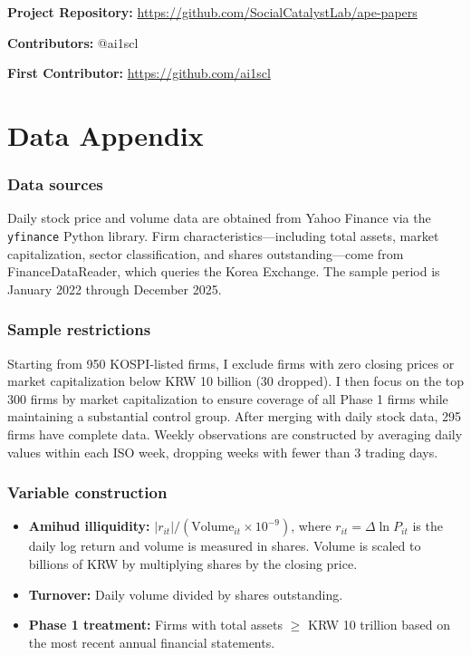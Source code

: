 \documentclass[12pt]{article}
\begin{document}
\noindent\textbf{Project Repository:} \url{https://github.com/SocialCatalystLab/ape-papers}

\noindent\textbf{Contributors:} @ai1scl

\noindent\textbf{First Contributor:} \url{https://github.com/ai1scl}

\label{apep_main_text_end}
\newpage


\newpage
\appendix

\section{Data Appendix}

\subsubsection*{Data sources} Daily stock price and volume data are obtained from Yahoo Finance via the \texttt{yfinance} Python library. Firm characteristics---including total assets, market capitalization, sector classification, and shares outstanding---come from FinanceDataReader, which queries the Korea Exchange. The sample period is January 2022 through December 2025.

\subsubsection*{Sample restrictions} Starting from 950 KOSPI-listed firms, I exclude firms with zero closing prices or market capitalization below KRW 10 billion (30 dropped). I then focus on the top 300 firms by market capitalization to ensure coverage of all Phase 1 firms while maintaining a substantial control group. After merging with daily stock data, 295 firms have complete data. Weekly observations are constructed by averaging daily values within each ISO week, dropping weeks with fewer than 3 trading days.

\subsubsection*{Variable construction}
\begin{itemize}
\item \textbf{Amihud illiquidity:} $|r_{it}| / (\text{Volume}_{it} \times 10^{-9})$, where $r_{it} = \Delta \ln P_{it}$ is the daily log return and volume is measured in shares. Volume is scaled to billions of KRW by multiplying shares by the closing price.
\item \textbf{Turnover:} Daily volume divided by shares outstanding.
\item \textbf{Phase 1 treatment:} Firms with total assets $\geq$ KRW 10 trillion based on the most recent annual financial statements.
\end{itemize}
\end{document}
